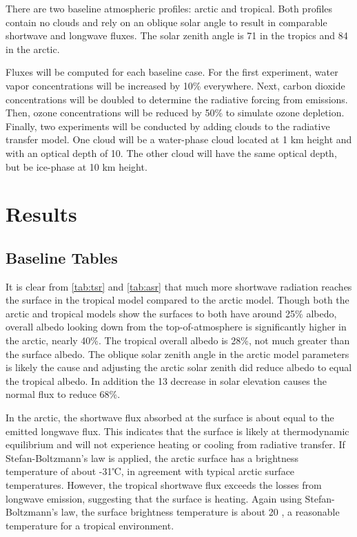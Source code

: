 \documentclass[twocol]{ametsoc}
\begin{document}
There are two baseline atmospheric profiles: arctic and tropical. Both profiles contain no clouds and rely on an oblique solar angle to result in comparable shortwave and longwave fluxes. The solar zenith angle is 71\degree{} in the tropics and 84\degree{} in the arctic.

Fluxes will be computed for each baseline case. For the first experiment, water vapor concentrations will be increased by 10\% everywhere. Next, carbon dioxide concentrations will be doubled to determine the radiative forcing from emissions. Then, ozone concentrations will be reduced by 50\% to simulate ozone depletion. Finally, two experiments will be conducted by adding clouds to the radiative transfer model. One cloud will be a water-phase cloud located at 1 km height and with an optical depth of 10. The other cloud will have the same optical depth, but be ice-phase at 10 km height.

\section{Results}

\subsection*{Baseline Tables}

It is clear from \autoref{tab:tsr} and \autoref{tab:asr} that much more shortwave radiation reaches the surface in the tropical model compared to the arctic model. Though both the arctic and tropical models show the surfaces to both have around 25\% albedo, overall albedo looking down from the top-of-atmosphere is significantly higher in the arctic, nearly 40\%. The tropical overall albedo is 28\%, not much greater than the surface albedo. The oblique solar zenith angle in the arctic model parameters is likely the cause and adjusting the arctic solar zenith did reduce albedo to equal the tropical albedo. In addition the 13 \degree{} decrease in solar elevation causes the normal flux to reduce 68\%.

In the arctic, the shortwave flux absorbed at the surface is about equal to the emitted longwave flux. This indicates that the surface is likely at thermodynamic equilibrium and will not experience heating or cooling from radiative transfer. If Stefan-Boltzmann’s law is applied, the arctic surface has a brightness temperature of about -31℃, in agreement with typical arctic surface temperatures. However, the tropical shortwave flux exceeds the losses from longwave emission, suggesting that the surface is heating. Again using Stefan-Boltzmann’s law, the surface brightness temperature is about 20 , a reasonable temperature for a tropical environment.
\end{document}
